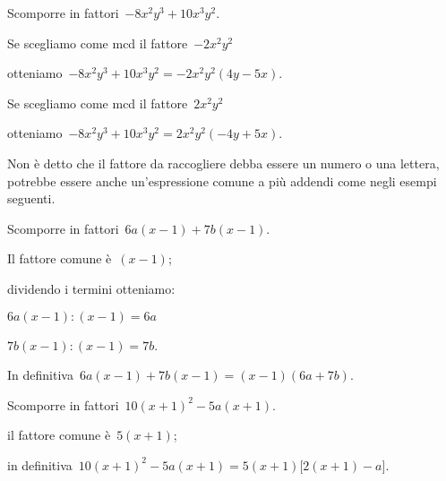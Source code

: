 \begin{exrig}
 \begin{esempio}
Scomporre in fattori~$-8x^{2}y^{3}+10x^{3}y^{2}$.
 \begin{enumerate*}
 \item \begin{enumeratea}
  \item Se scegliamo come mcd il fattore~$-2x^{2}y^{2}$
  \item otteniamo~$-8x^{2}y^{3}+10x^{3}y^{2}=-2x^{2}y^{2}(4y-5x)$.
 \end{enumeratea}
 \item \begin{enumeratea}
  \item Se scegliamo come mcd il fattore~$2x^{2}y^{2}$
  \item otteniamo~$-8x^{2}y^{3}+10x^{3}y^{2}=2x^{2}y^{2}(-4y+5x)$.
 \end{enumeratea}
 \end{enumerate*}
 \end{esempio}


\end{exrig}

Non è detto che il fattore da raccogliere debba essere un numero o una lettera, 
potrebbe essere anche un'espressione comune a più addendi come negli esempi 
seguenti.


\begin{exrig}

 \begin{esempio}
Scomporre in fattori~$6a(x-1)+7b(x-1)$.
  \begin{enumeratea}
  \item Il fattore comune è~$(x-1)$; 
  \item dividendo i termini otteniamo:
   \begin{itemize*}
    \item $6a(x-1):(x-1)=6a$
    \item $7b(x-1):(x-1)=7b$.
   \end{itemize*}
  \end{enumeratea}
  \item In definitiva~$6a(x-1)+7b(x-1)=(x-1)(6a+7b)$.
 \end{esempio}

 \begin{esempio}
Scomporre in fattori~$10(x+1)^{2}-5a(x+1)$.
  \begin{enumeratea}
  \item il fattore comune è~$5(x+1)$;
  \item in definitiva~$10(x+1)^{2}-5a(x+1)=5(x+1)\bigl[2(x+1)-a \bigr]$.
  \end{enumeratea}
 \end{esempio}

\end{exrig}

